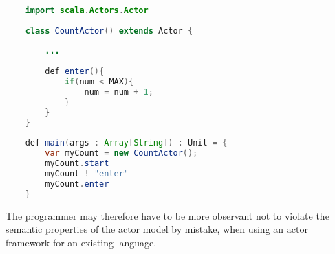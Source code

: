 \begin{lstlisting}[label=lst:actor_state_encapsulation_violation,
  caption={Scala Actors violating state encapsulation},
  language=Java,  
  showspaces=false,
  showtabs=false,
  breaklines=true,
  showstringspaces=false,
  breakatwhitespace=true,
  commentstyle=\color{greencomments},
  keywordstyle=\color{bluekeywords},
  stringstyle=\color{redstrings}]  % Start your code-block
	
	import scala.Actors.Actor
	
	class CountActor() extends Actor {
				
		...
		
		def enter(){
			if(num < MAX){
				num = num + 1;
			}
		}
	}
	
	def main(args : Array[String]) : Unit = {
		var myCount = new CountActor();
		myCount.start
		myCount ! "enter"
		myCount.enter
	}
\end{lstlisting}

The programmer may therefore have to be more observant not to violate the semantic properties of the actor model by mistake, when using an actor framework for an existing language.




